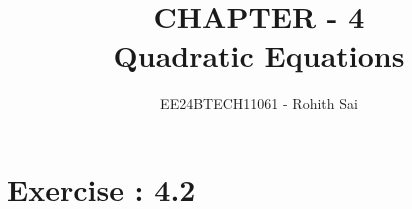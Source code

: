 \documentclass[journal]{IEEEtran}
\begin{document}

\vspace{3cm}

\title{CHAPTER - 4\\Quadratic Equations}
\author{EE24BTECH11061 - Rohith Sai}

{\let\newpage\relax\maketitle}

\renewcommand{\thefigure}{\theenumi}
\renewcommand{\thetable}{\theenumi}
\setlength{\intextsep}{10pt}

\renewcommand{\thetable}{\theenumi}

\section*{Exercise : 4.2}
\end{document}
